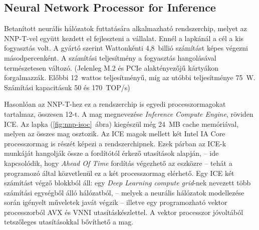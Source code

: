 \subsection[NNP-I]{Neural Network Processor for Inference}
Betanított neurális hálózatok futtatására alkalmazható rendszerchip, melyet az NNP-T-vel együtt kezdett el fejleszteni a vállalat. Ennél a lapkánál a cél a kis fogyasztás volt. A gyártó szerint Wattonkénti 4,8~billió számítást képes végezni másodpercenként. A számítási teljesítmény a fogyasztás hangolásával természetesen változó. (Jelenleg M.2 és PCIe alaktényezőjű kártyákon forgalmazzák. Előbbi 12~wattos teljesítményű, míg az utóbbi teljesítménye 75~W. Számítási kapacitásuk 50 és 170~TOP/s)

Hasonlóan az NNP-T-hez ez a rendszerchip is egyedi processzormagokat tartalmaz, összesen 12-t. A mag megnevezése \emph{Inference Compute Engine}, röviden ICE. Az lapka (\ref{fig:nnp-isoc}~ábra) kiegészül még 24~MB cache memóriával, melyen az összes mag osztozik.
Az ICE magok mellett két Intel IA Core processzormag is részét képezi a rendszerchipnek. Ezek párban az ICE-k munkáját hangolják össze a fordítótól érkező utasítások alapján, -- ide kapcsolódik, hogy \emph{Ahead Of Time} fordítás végezhető az eszközre -- tehát a programozó által közvetlenül ez a két processzormag elérhető. Egy ICE két számítást végző blokkból áll: egy \emph{Deep Learning compute grid}-nek nevezett több számítási egységből álló hálózatból, -- melyek a neurális hálózatok modellezése során igényelt műveletek javát végzik -- illetve egy programozható vektor processzorból AVX és VNNI utasításkészlettel. A vektor processzor jóvoltából tetszőleges utasításokkal bővíthető a mag.

